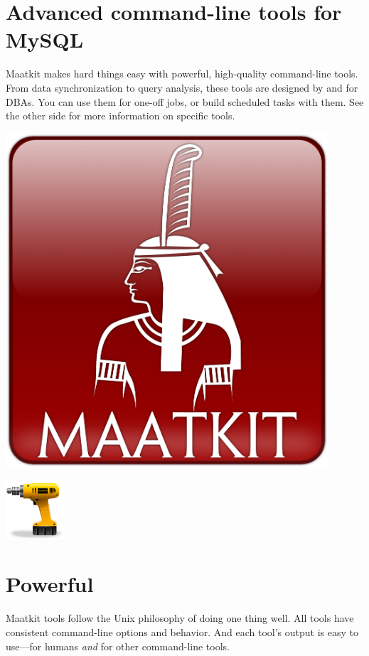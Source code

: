 \documentclass[letterpaper,twoside,12pt]{article}
\begin{document}
\begin{minipage}{0.8\textwidth}
\section*{\LARGE Advanced command-line tools for MySQL\tiny\textregistered}
\normalsize
Maatkit makes hard things easy with powerful, high-quality command-line tools.
From data synchronization to query analysis, these tools are designed by and for
DBAs. You can use them for one-off jobs, or build scheduled tasks with them. See
the other side for more information on specific tools.
\end{minipage}
\hspace*{0.5cm}
\begin{minipage}{0.2\textwidth}
\includegraphics[width=0.9\textwidth]{../logo/maatkit-logo-glossy.png}
\end{minipage}


\begin{minipage}{0.2\textwidth}
\includegraphics[width=0.853in]{../image/package_utilities}
\end{minipage}
\begin{minipage}{0.8\textwidth}
\section*{Powerful}
Maatkit tools follow the Unix philosophy of doing one thing 
well.  All tools have consistent command-line options and
behavior.  And each tool's output is easy to use---for humans
\emph{and} for other command-line tools.
\end{minipage}
\vspace*{1cm}
\end{document}
